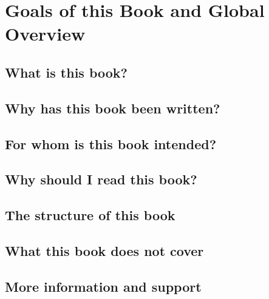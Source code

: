 \setcounter{chapter}{-1}

\chapter{Goals of this Book and Global Overview}

\section{What is this book?}

\section{Why has this book been written?}

\section{For whom is this book intended?}

\section{Why should I read this book?}

\section{The structure of this book}

\section{What this book does not cover}

\section{More information and support}





